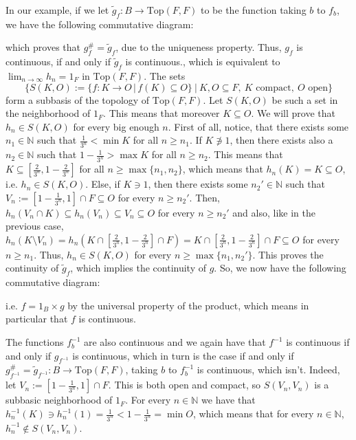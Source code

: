 \begin{example}
In our example, if we let $\tilde{g}_f:B\to\mathrm{Top}(F,F)$ to be the function taking $b$ to $f_b$, we have the following commutative diagram:
\begin{center}
\end{center}
which proves that $g_f^{\#}=\tilde{g}_f$, due to the uniqueness property. Thus, $g_f$ is continuous, if and only if $\tilde{g}_f$ is continuous., which is equivalent to $\lim_{n\to\infty}h_n=1_F$ in $\mathrm{Top}(F,F)$. The sets
\[\Big\{S(K,O):=\{f:K\to O\,|\,f(K)\subseteq O\}\ \Big|\ K,O\subseteq F,\ K\text{ compact},\ O\text{ open}\Big\}\]
form a subbasis of the topology of $\mathrm{Top}(F,F)$.
Let $S(K,O)$ be such a set in the neighborhood of $1_F$. This means that moreover $K\subseteq O$. We will prove that $h_n\in S(K,O)$ for every big enough $n$. First of all, notice, that there exists some $n_1\in\mathbb{N}$ such that $\frac{1}{3^n}<\min K$ for all $n\geq n_1$. If $K\not\ni 1$, then there exists also a $n_2\in\mathbb{N}$ such that $1-\frac{1}{3^n}>\max K$ for all $n\geq n_2$. This means that $K\subseteq[\frac{2}{3^n},1-\frac{2}{3^n}]$ for all $n\geq\max\{n_1,n_2\}$, which means that $h_n(K)=K\subseteq O$, i.e. $h_n\in S(K,O)$. Else, if $K\ni 1$, then there exists some $n_2'\in\mathbb{N}$ such that $V_n:=[1-\frac{1}{3^n},1]\cap F\subseteq O$ for every $n\geq n_2'$. Then, $h_n(V_n\cap K)\subseteq h_n(V_n)\subseteq V_n\subseteq O$ for every $n\geq n_2'$ and also, like in the previous case, $h_n(K\setminus V_n)= h_n(K\cap[\frac{2}{3^n},1-\frac{2}{3^n}]\cap F)=K\cap[\frac{2}{3^n},1-\frac{2}{3^n}]\cap F\subseteq O$ for every $n\geq n_1$. Thus, $h_n\in S(K,O)$ for every $n\geq\max\{n_1,n_2'\}$. This proves the continuity of $\tilde{g}_f$, which implies the continuity of $g$. So, we now have the following commutative diagram:
\begin{center}
\end{center}
i.e. $f=1_B\times g$ by the universal property of the product, which means in particular that $f$ is continuous.

The functions $f_b^{-1}$ are also continuous and we again have that $f^{-1}$ is continuous if and only if $g_{f^{-1}}$ is continuous, which in turn is the case if and only if $g_{f^{-1}}^{\#}=\tilde{g}_{f^{-1}}:B\to\mathrm{Top}(F,F)$, taking $b$ to $f_b^{-1}$ is continuous, which isn't. Indeed, let $V_n:=[1-\frac{1}{3^n},1]\cap F$. This is both open and compact, so $S(V_n,V_n)$ is a subbasic neighborhood of $1_F$. For every $n\in\mathbb{N}$ we have that $h_n^{-1}(K)\ni h_n^{-1}(1)=\frac{1}{3^n}<1-\frac{1}{3^n}=\min O$, which means that for every $n\in\mathbb{N}$, $h^{-1}_n\not\in S(V_n,V_n)$.
\end{example}

